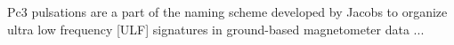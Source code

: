 
Pc3 pulsations are a part of the naming scheme developed by Jacobs to
organize ultra low frequency [ULF] signatures in ground-based
magnetometer data ...
